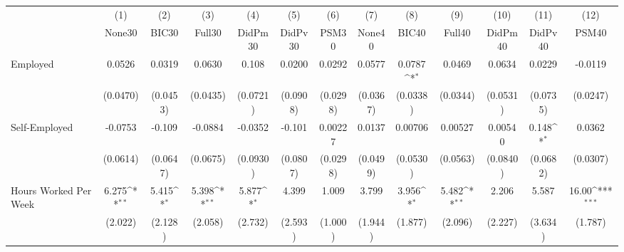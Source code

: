 {
\def\sym#1{\ifmmode^{#1}\else\(^{#1}\)\fi}
\begin{tabular}{l*{12}{c}}
\toprule
            &\multicolumn{1}{c}{(1)}&\multicolumn{1}{c}{(2)}&\multicolumn{1}{c}{(3)}&\multicolumn{1}{c}{(4)}&\multicolumn{1}{c}{(5)}&\multicolumn{1}{c}{(6)}&\multicolumn{1}{c}{(7)}&\multicolumn{1}{c}{(8)}&\multicolumn{1}{c}{(9)}&\multicolumn{1}{c}{(10)}&\multicolumn{1}{c}{(11)}&\multicolumn{1}{c}{(12)}\\
            &\multicolumn{1}{c}{None30}&\multicolumn{1}{c}{BIC30}&\multicolumn{1}{c}{Full30}&\multicolumn{1}{c}{DidPm30}&\multicolumn{1}{c}{DidPv30}&\multicolumn{1}{c}{PSM30}&\multicolumn{1}{c}{None40}&\multicolumn{1}{c}{BIC40}&\multicolumn{1}{c}{Full40}&\multicolumn{1}{c}{DidPm40}&\multicolumn{1}{c}{DidPv40}&\multicolumn{1}{c}{PSM40}\\
\midrule
Employed    &      0.0526         &      0.0319         &      0.0630         &       0.108         &      0.0200         &      0.0292         &      0.0577         &      0.0787\sym{*}  &      0.0469         &      0.0634         &      0.0229         &     -0.0119         \\
            &    (0.0470)         &    (0.0453)         &    (0.0435)         &    (0.0721)         &    (0.0908)         &    (0.0298)         &    (0.0367)         &    (0.0338)         &    (0.0344)         &    (0.0531)         &    (0.0735)         &    (0.0247)         \\
\addlinespace
Self-Employed&     -0.0753         &      -0.109         &     -0.0884         &     -0.0352         &      -0.101         &     0.00227         &      0.0137         &     0.00706         &     0.00527         &     0.00540         &       0.148\sym{*}  &      0.0362         \\
            &    (0.0614)         &    (0.0647)         &    (0.0675)         &    (0.0930)         &    (0.0807)         &    (0.0298)         &    (0.0499)         &    (0.0530)         &    (0.0563)         &    (0.0840)         &    (0.0682)         &    (0.0307)         \\
\addlinespace
Hours Worked Per Week&       6.275\sym{**} &       5.415\sym{*}  &       5.398\sym{**} &       5.877\sym{*}  &       4.399         &       1.009         &       3.799         &       3.956\sym{*}  &       5.482\sym{**} &       2.206         &       5.587         &       16.00\sym{***}\\
            &     (2.022)         &     (2.128)         &     (2.058)         &     (2.732)         &     (2.593)         &     (1.000)         &     (1.944)         &     (1.877)         &     (2.096)         &     (2.227)         &     (3.634)         &     (1.787)         \\

\end{tabular}}
